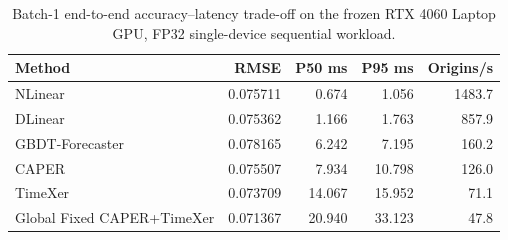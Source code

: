 \begin{table}[t]
\centering
\caption{Batch-1 end-to-end accuracy--latency trade-off on the frozen RTX 4060 Laptop GPU, FP32 single-device sequential workload.}
\label{tab:latency}
\small
\begin{tabular}{lrrrr}
\toprule
Method & RMSE & P50 ms & P95 ms & Origins/s \\
\midrule
NLinear & 0.075711 & 0.674 & 1.056 & 1483.7 \\
DLinear & 0.075362 & 1.166 & 1.763 & 857.9 \\
GBDT-Forecaster & 0.078165 & 6.242 & 7.195 & 160.2 \\
CAPER & 0.075507 & 7.934 & 10.798 & 126.0 \\
TimeXer & 0.073709 & 14.067 & 15.952 & 71.1 \\
Global Fixed CAPER+TimeXer & 0.071367 & 20.940 & 33.123 & 47.8 \\
\bottomrule
\end{tabular}
\end{table}
